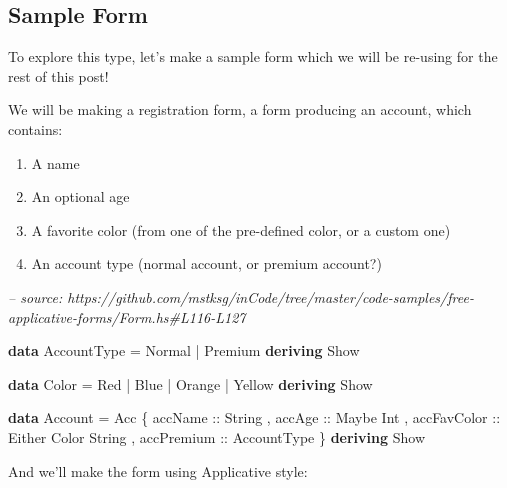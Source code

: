 \documentclass[]{article}
\newenvironment{Shaded}{}{}
\newcommand{\CommentTok}[1]{\textcolor[rgb]{0.38,0.63,0.69}{\textit{#1}}}
\newcommand{\DataTypeTok}[1]{\textcolor[rgb]{0.56,0.13,0.00}{#1}}
\newcommand{\FunctionTok}[1]{\textcolor[rgb]{0.02,0.16,0.49}{#1}}
\newcommand{\KeywordTok}[1]{\textcolor[rgb]{0.00,0.44,0.13}{\textbf{#1}}}
\newcommand{\NormalTok}[1]{#1}
\newcommand{\OtherTok}[1]{\textcolor[rgb]{0.00,0.44,0.13}{#1}}
\begin{document}
\hypertarget{sample-form}{%
\subsection{Sample Form}\label{sample-form}}

To explore this type, let's make a sample form which we will be re-using for the
rest of this post!

We will be making a registration form, a form producing an account, which
contains:

\begin{enumerate}
\def\labelenumi{\arabic{enumi}.}
\tightlist
\item
  A name
\item
  An optional age
\item
  A favorite color (from one of the pre-defined color, or a custom one)
\item
  An account type (normal account, or premium account?)
\end{enumerate}

\begin{Shaded}
\begin{Highlighting}[]
\CommentTok{-- source: https://github.com/mstksg/inCode/tree/master/code-samples/free-applicative-forms/Form.hs#L116-L127}

\KeywordTok{data} \DataTypeTok{AccountType} \FunctionTok{=} \DataTypeTok{Normal} \FunctionTok{|} \DataTypeTok{Premium}
    \KeywordTok{deriving} \DataTypeTok{Show}

\KeywordTok{data} \DataTypeTok{Color} \FunctionTok{=} \DataTypeTok{Red} \FunctionTok{|} \DataTypeTok{Blue} \FunctionTok{|} \DataTypeTok{Orange} \FunctionTok{|} \DataTypeTok{Yellow}
    \KeywordTok{deriving} \DataTypeTok{Show}

\KeywordTok{data} \DataTypeTok{Account} \FunctionTok{=} \DataTypeTok{Acc}\NormalTok{ \{}\OtherTok{ accName     ::} \DataTypeTok{String}
\NormalTok{                   ,}\OtherTok{ accAge      ::} \DataTypeTok{Maybe} \DataTypeTok{Int}
\NormalTok{                   ,}\OtherTok{ accFavColor ::} \DataTypeTok{Either} \DataTypeTok{Color} \DataTypeTok{String}
\NormalTok{                   ,}\OtherTok{ accPremium  ::} \DataTypeTok{AccountType}
\NormalTok{                   \}}
    \KeywordTok{deriving} \DataTypeTok{Show}
\end{Highlighting}
\end{Shaded}

And we'll make the form using Applicative style:
\end{document}
